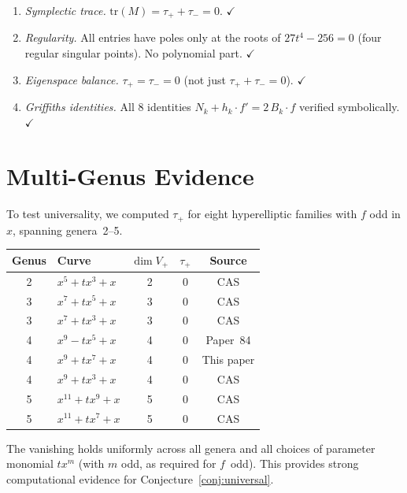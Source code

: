 \documentclass[11pt]{article}
\theoremstyle{plain}
\theoremstyle{definition}
\theoremstyle{remark}
\newcommand{\tr}{\mathrm{tr}}
\begin{document}
\begin{enumerate}[nosep]
\item \emph{Symplectic trace.} $\tr(M) = \tau_+ + \tau_- = 0$.
  $\checkmark$
\item \emph{Regularity.} All entries have poles only at the roots of
  $27t^4 - 256 = 0$ (four regular singular points). No polynomial
  part. $\checkmark$
\item \emph{Eigenspace balance.} $\tau_+ = \tau_- = 0$ (not just
  $\tau_+ + \tau_- = 0$). $\checkmark$
\item \emph{Griffiths identities.} All 8 identities
  $N_k + h_k \cdot f' = 2\, B_k \cdot f$ verified symbolically.
  $\checkmark$
\end{enumerate}

\section{Multi-Genus Evidence}\label{sec:multi}

To test universality, we computed $\tau_+$ for eight hyperelliptic
families with $f$ odd in $x$, spanning genera~2--5.

\begin{center}
\begin{tabular}{clccc}
\toprule
Genus & Curve & $\dim V_+$ & $\tau_+$ & Source \\
\midrule
2 & $x^5 + tx^3 + x$ & 2 & 0 & CAS \\
3 & $x^7 + tx^5 + x$ & 3 & 0 & CAS \\
3 & $x^7 + tx^3 + x$ & 3 & 0 & CAS \\
4 & $x^9 - tx^5 + x$ & 4 & 0 & Paper~84 \\
4 & $x^9 + tx^7 + x$ & 4 & 0 & This paper \\
4 & $x^9 + tx^3 + x$ & 4 & 0 & CAS \\
5 & $x^{11} + tx^9 + x$ & 5 & 0 & CAS \\
5 & $x^{11} + tx^7 + x$ & 5 & 0 & CAS \\
\bottomrule
\end{tabular}
\end{center}

The vanishing holds uniformly across all genera and all choices of
parameter monomial $tx^m$ (with $m$ odd, as required for $f$~odd).
This provides strong computational evidence for
Conjecture~\ref{conj:universal}.
\end{document}
